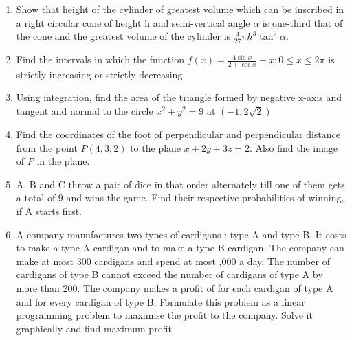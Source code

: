 \documentclass[journal,12pt,onecolumn]{IEEEtran}
\theoremstyle{remark}
\providecommand{\brak}[1]{\ensuremath{\left(#1\right)}}
\begin{document}
\begin{enumerate}
    \item Show that height of the cylinder of greatest volume which can be inscribed in a right circular cone of height h and semi-vertical angle $\alpha$ is one-third that of the cone and the greatest volume of the cylinder is $\frac{4}{27} \pi h^3 \tan^2 \alpha$.
    \item Find the intervals in which the function $f\brak{x}= \frac{4\sin x}{2+\cos x} -x ; 0 \leq x \leq 2\pi$ is strictly increasing or strictly decreasing.
    \item Using integration, find the area of the triangle formed by negative x-axis and tangent and normal to the circle $x^2 + y^2 =9$ at \brak{-1,2\sqrt{2}}
    \item Find the coordinates of the foot of perpendicular and perpendicular distance from the point $P\brak{4, 3, 2}$ to the plane $x+2y+3z=2$. Also find the image of $P$ in the plane.
    \item A, B and C throw a pair of dice in that order alternately till one of them gets a total of 9 and wins the game. Find their respective probabilities of winning, if A starts first.
    \item A company manufactures two types of cardigans : type A and type B. It costs  to make a type A cardigan and  to make a type B cardigan. The company can make at most 300 cardigans and spend at most ,000 a day. The number of cardigans of type B cannot exceed the number of cardigans of type A by more than 200. The company makes a profit of  for each cardigan of type A and  for every cardigan of type B. Formulate this problem as a linear programming problem to maximise the profit to the company. Solve it graphically and find maximum profit.
\end{enumerate}
\end{document}
